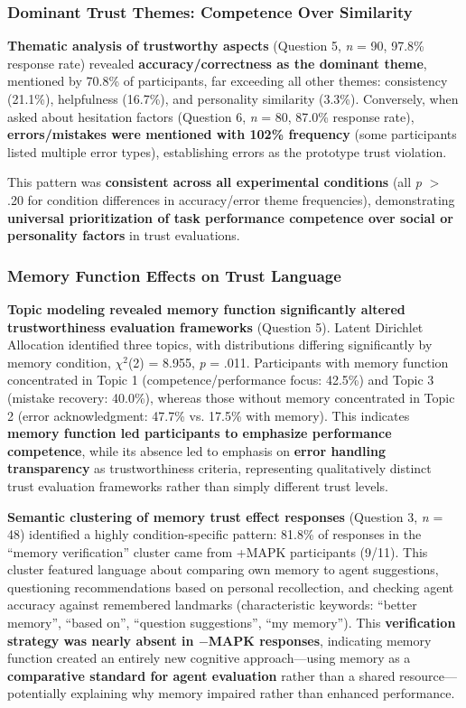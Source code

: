 \documentclass[12pt]{article}
\begin{document}
\subsubsection{Dominant Trust Themes: Competence Over Similarity}

\textbf{Thematic analysis of trustworthy aspects} (Question 5, \textit{n} = 90, 97.8\% response rate) revealed \textbf{accuracy/correctness as the dominant theme}, mentioned by 70.8\% of participants, far exceeding all other themes: consistency (21.1\%), helpfulness (16.7\%), and personality similarity (3.3\%). Conversely, when asked about hesitation factors (Question 6, \textit{n} = 80, 87.0\% response rate), \textbf{errors/mistakes were mentioned with 102\% frequency} (some participants listed multiple error types), establishing errors as the prototype trust violation.

This pattern was \textbf{consistent across all experimental conditions} (all \textit{p} $>$ .20 for condition differences in accuracy/error theme frequencies), demonstrating \textbf{universal prioritization of task performance competence over social or personality factors} in trust evaluations.

\subsubsection{Memory Function Effects on Trust Language}

\textbf{Topic modeling revealed memory function significantly altered trustworthiness evaluation frameworks} (Question 5). Latent Dirichlet Allocation identified three topics, with distributions differing significantly by memory condition, $\chi^2$(2) = 8.955, \textit{p} = .011. Participants with memory function concentrated in Topic 1 (competence/performance focus: 42.5\%) and Topic 3 (mistake recovery: 40.0\%), whereas those without memory concentrated in Topic 2 (error acknowledgment: 47.7\% vs. 17.5\% with memory). This indicates \textbf{memory function led participants to emphasize performance competence}, while its absence led to emphasis on \textbf{error handling transparency} as trustworthiness criteria, representing qualitatively distinct trust evaluation frameworks rather than simply different trust levels.

\textbf{Semantic clustering of memory trust effect responses} (Question 3, \textit{n} = 48) identified a highly condition-specific pattern: 81.8\% of responses in the ``memory verification'' cluster came from +MAPK participants (9/11). This cluster featured language about comparing own memory to agent suggestions, questioning recommendations based on personal recollection, and checking agent accuracy against remembered landmarks (characteristic keywords: ``better memory'', ``based on'', ``question suggestions'', ``my memory''). This \textbf{verification strategy was nearly absent in $-$MAPK responses}, indicating memory function created an entirely new cognitive approach—using memory as a \textbf{comparative standard for agent evaluation} rather than a shared resource—potentially explaining why memory impaired rather than enhanced performance.
\end{document}
